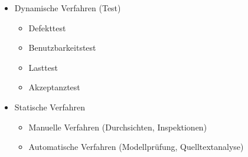             \begin{itemize}
              \item Dynamische Verfahren (Test)
                \begin{itemize}
                  \item Defekttest
                  \item Benutzbarkeitstest
                  \item Lasttest
                  \item Akzeptanztest
                \end{itemize}
              \item Statische Verfahren
                \begin{itemize}
                  \item Manuelle Verfahren (Durchsichten, Inspektionen)
                  \item Automatische Verfahren (Modellprüfung, Quelltextanalyse)
                \end{itemize}
            \end{itemize}

